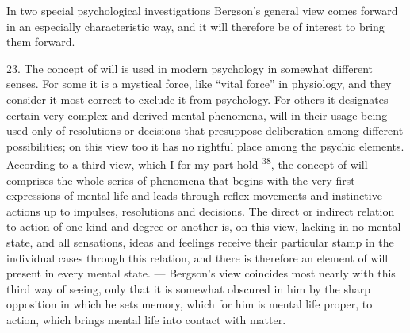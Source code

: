 \documentclass[12pt,a4paper,openany]{book}
\newcommand{\nm}[1]{\unskip\textsuperscript{#1}}
\begin{document}
In two special psychological investigations Bergson's general view comes forward in an especially characteristic way, and it will therefore be of interest to bring them forward.

23. The concept of will is used in modern psychology in somewhat different senses. For some it is a mystical force, like ``vital force'' in physiology, and they consider it most correct to exclude it from psychology. For others it designates certain very complex and derived mental phenomena, will in their usage being used only of resolutions or decisions that presuppose deliberation among different possibilities; on this view too it has no rightful place among the psychic elements. According to a third view, which I for my part hold \nm{38}, the concept of will comprises the whole series of phenomena that begins with the very first expressions of mental life and leads through reflex movements and instinctive actions up to impulses, resolutions and decisions. The direct or indirect relation to action of one kind and degree or another is, on this view, lacking in no mental state, and all sensations, ideas and feelings receive their particular stamp in the individual cases through this relation, and there is therefore an element of will present in every mental state. --- Bergson's view coincides most nearly with this third way of seeing, only that it is somewhat obscured in him by the sharp opposition in which he sets memory, which for him is mental life proper, to action, which brings mental life into contact with matter.
\end{document}
